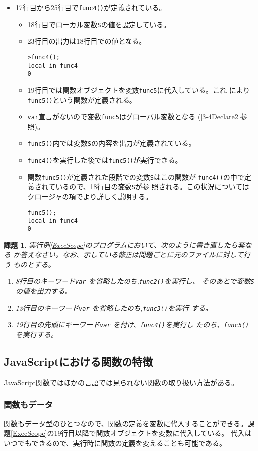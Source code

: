 \documentclass[a4j]{jarticle}
\newtheorem{Prob}{課題}[section]
\begin{document}
\begin{itemize}
 \item 17行目から25行目で\verb+func4()+が定義されている。
\begin{itemize}
 \item 18行目でローカル変数\verb+S+の値を設定している。
 \item 23行目の出力は18行目での値となる。
\begin{Verbatim}
>func4();
local in func4
0
\end{Verbatim}
 \item 19行目では関数オブジェクトを変数\verb+func5+に代入している。これ
       により\verb+func5()+という関数が定義される。
 \item \verb+var+宣言がないので変数\verb+func5+はグローバル変数となる
       (\ref{3-4Declare2}参照)。
 \item \verb+func5()+内では変数\verb+S+の内容を出力が定義されている。
 \item \verb+func4()+を実行した後では\verb+func5()+が実行できる。
 \item 関数\verb+func5()+が定義された段階での変数\verb+S+はこの関数が
       \verb+func4()+の中で定義されているので、18行目の変数\verb+S+が参
       照される。この状況についてはクロージャの項でより詳しく説明する。
\begin{Verbatim}
func5();
local in func4
0
\end{Verbatim}
\end{itemize}
\end{itemize}
\begin{Prob}
 実行例\ref{ExecScope}のプログラムにおいて、次のように書き直したら套なる
 か答えなさい。なお、示している修正は問題ごとに元のファイルに対して行う
 ものとする。
\begin{enumerate}
 \item 8行目のキーワード\verb+var+ を省略したのち,\verb+func2()+を実行し、
       そのあとで変数\verb+S+の値を出力する。
 \item 13行目のキーワード\verb+var+ を省略したのち,\verb+func3()+を実行
       する。
 \item 19行目の先頭にキーワード\verb+var+ を付け、\verb+func4()+を実行し
       たのち、\verb+func5()+を実行する。
\end{enumerate}
\end{Prob}
\subsection{JavaScriptにおける関数の特徴}
JavaScript関数ではほかの言語では見られない関数の取り扱い方法がある。
\subsubsection{関数もデータ}
関数もデータ型のひとつなので、関数の定義を変数に代入することができる。課
題\ref{ExecScope}の19行目以降で関数オブジェクトを変数に代入している。
代入はいつでもできるので、実行時に関数の定義を変えることも可能である。
\end{document}

